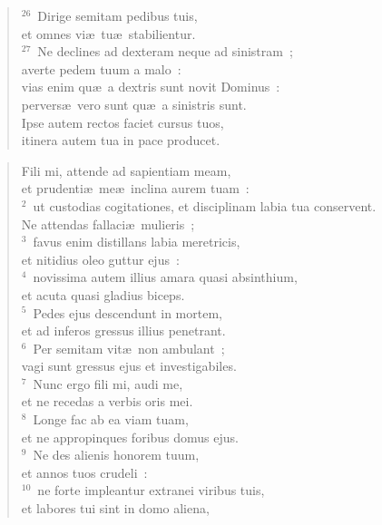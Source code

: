 \begin{flushleft}
\begin{verse}
${}^{26}$~Dirige semitam pedibus tuis,\\ et omnes vi\ae\ tu\ae\ stabilientur.\\
${}^{27}$~Ne declines ad dexteram neque ad sinistram~;\\ averte pedem tuum a malo~:\\ vias enim qu\ae\ a dextris sunt novit Dominus~:\\ pervers\ae\ vero sunt qu\ae\ a sinistris sunt.\\ Ipse autem rectos faciet cursus tuos,\\ itinera autem tua in pace producet.\end{verse}\end{flushleft}


\begin{flushleft}\begin{verse}\vspace{-19pt}Fili mi, attende ad sapientiam meam,\\ et prudenti\ae\ me\ae\ inclina aurem tuam~:\\
${}^{2}$~ut custodias cogitationes, et disciplinam labia tua conservent.\\ Ne attendas fallaci\ae\ mulieris~;\\
${}^{3}$~favus enim distillans labia meretricis,\\ et nitidius oleo guttur ejus~:\\
${}^{4}$~novissima autem illius amara quasi absinthium,\\ et acuta quasi gladius biceps.\\
${}^{5}$~Pedes ejus descendunt in mortem,\\ et ad inferos gressus illius penetrant.\\
${}^{6}$~Per semitam vit\ae\ non ambulant~;\\ vagi sunt gressus ejus et investigabiles.\\
${}^{7}$~Nunc ergo fili mi, audi me,\\ et ne recedas a verbis oris mei.\\
${}^{8}$~Longe fac ab ea viam tuam,\\ et ne appropinques foribus domus ejus.\\
${}^{9}$~Ne des alienis honorem tuum,\\ et annos tuos crudeli~:\\
${}^{10}$~ne forte impleantur extranei viribus tuis,\\ et labores tui sint in domo aliena,\\

\end{verse}
\end{flushleft}
